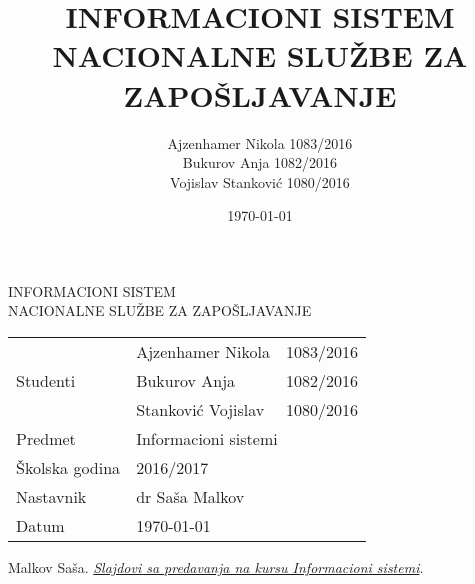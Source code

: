 \documentclass[a4paper, 12pt]{article}
\author{Ajzenhamer Nikola 1083/2016\\Bukurov Anja 1082/2016\\Vojislav Stankovi\'c 1080/2016}
\title{INFORMACIONI SISTEM NACIONALNE SLU\v ZBE ZA ZAPO\v SLJAVANJE}
\date{\today}
\begin{document}
\begin{titlepage}
	\centering
	
	\vspace{0.3\textheight}
	
	{\Huge INFORMACIONI SISTEM\\NACIONALNE SLU\v ZBE ZA ZAPO\v SLJAVANJE}
	
	\vfill
	
	{
		\Large 
		\begin{tabular}{|l|l|l|}
			\hline
			\multirow{3}{*}{Studenti} & Ajzenhamer Nikola     & 1083/2016\\ \cline{2-3}
			                          & Bukurov Anja          & 1082/2016\\ \cline{2-3}
			                          & Stankovi\' c Vojislav & 1080/2016\\
			\hline
			Predmet                   & \multicolumn{2}{l|}{Informacioni sistemi}\\
			\hline
			\v Skolska godina         & \multicolumn{2}{l|}{2016/2017}\\
			\hline
			Nastavnik                 & \multicolumn{2}{l|}{dr Sa\v sa Malkov}\\
			\hline
			Datum                     & \multicolumn{2}{l|}{\today}\\
			\hline
		\end{tabular}
	}
\end{titlepage}
\newpage
\tableofcontents
\newpage









\thispagestyle{empty}
\begin{thebibliography}{9}
	
	Malkov Sa\v sa.
	\href{http://poincare.matf.bg.ac.rs/~smalkov/nastava.master.html\#r271\_is}{\textit{Slajdovi sa predavanja na kursu Informacioni sistemi}}.
	
\end{thebibliography}
\end{document}
